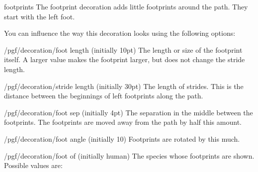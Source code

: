 \begin{decoration}{footprints}
    The footprint decoration adds little footprints around the path. They start
    with the left foot.
\begin{codeexample}[]
\end{codeexample}
    You can influence the way this decoration looks using the following
    options:
    \begin{key}{/pgf/decoration/foot length (initially 10pt)}
        The length or size of the footprint itself. A larger value makes the
        footprint larger, but does not change the stride length.
\begin{codeexample}[]
\end{codeexample}
    \end{key}
    \begin{key}{/pgf/decoration/stride length (initially 30pt)}
        The length of strides. This is the distance between the beginnings of
        left footprints along the path.
\begin{codeexample}[]
\end{codeexample}
    \end{key}
    \begin{key}{/pgf/decoration/foot sep (initially 4pt)}
        The separation in the middle between the footprints. The footprints are
        moved away from the path by half this amount.
\begin{codeexample}[]
\end{codeexample}
    \end{key}
    \begin{key}{/pgf/decoration/foot angle (initially 10)}
        Footprints are rotated by this much.
\begin{codeexample}[]
\end{codeexample}
    \end{key}
    \begin{key}{/pgf/decoration/foot of (initially human)}
        The species whose footprints are shown. Possible values are:


\end{key}
\end{decoration}
